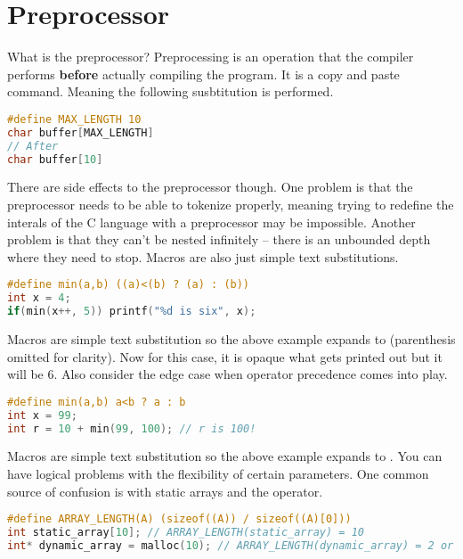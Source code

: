 \section{Preprocessor}

What is the preprocessor? Preprocessing is an operation that the compiler performs \textbf{before} actually compiling the program. It is a copy and paste command. Meaning the following susbtitution is performed.

\begin{lstlisting}[language=C]
#define MAX_LENGTH 10
char buffer[MAX_LENGTH]
// After
char buffer[10]
\end{lstlisting}

There are side effects to the preprocessor though. One problem is that the preprocessor needs to be able to tokenize properly, meaning trying to redefine the interals of the C language with a preprocessor may be impossible. Another problem is that they can't be nested infinitely -- there is an unbounded depth where they need to stop. Macros are also just simple text substitutions.

\begin{lstlisting}[language=C]
#define min(a,b) ((a)<(b) ? (a) : (b))
int x = 4;
if(min(x++, 5)) printf("%d is six", x);
\end{lstlisting}

Macros are simple text substitution so the above example expands to  (parenthesis omitted for clarity). Now for this case, it is opaque what gets printed out but it will be 6. Also consider the edge case when operator precedence comes into play.

\begin{lstlisting}[language=C]
#define min(a,b) a<b ? a : b
int x = 99;
int r = 10 + min(99, 100); // r is 100!
\end{lstlisting}

Macros are simple text substitution so the above example expands to . You can have logical problems with the flexibility of certain parameters. One common source of confusion is with static arrays and the  operator.

\begin{lstlisting}[language=C]
#define ARRAY_LENGTH(A) (sizeof((A)) / sizeof((A)[0]))
int static_array[10]; // ARRAY_LENGTH(static_array) = 10
int* dynamic_array = malloc(10); // ARRAY_LENGTH(dynamic_array) = 2 or 1
\end{lstlisting}

